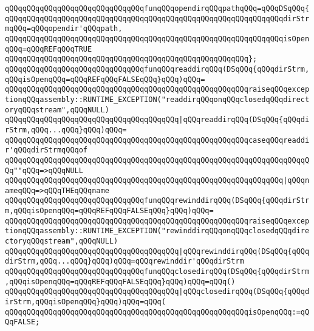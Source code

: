 \newline
\verb|qQQqqQQqqQQqqQQqqQQqqQQqqQQqqQQqfunqQQqopendirqQQqpathqQQq=qQQqDSqQQq{|\newline
\verb|qQQqqQQqqQQqqQQqqQQqqQQqqQQqqQQqqQQqqQQqqQQqqQQqqQQqqQQqqQQqqQQqdirStrmqQQq=qQQqopendir'qQQqpath,|\newline
\verb|qQQqqQQqqQQqqQQqqQQqqQQqqQQqqQQqqQQqqQQqqQQqqQQqqQQqqQQqqQQqqQQqisOpenqQQq=qQQqREFqQQqTRUE|\newline
\verb|qQQqqQQqqQQqqQQqqQQqqQQqqQQqqQQqqQQqqQQqqQQqqQQqqQQqqQQq};|\newline
\verb|qQQqqQQqqQQqqQQqqQQqqQQqqQQqqQQqfunqQQqreaddirqQQq(DSqQQq{qQQqdirStrm,qQQqisOpenqQQq=qQQqREFqQQqFALSEqQQq}qQQq)qQQq=|\newline
\verb|qQQqqQQqqQQqqQQqqQQqqQQqqQQqqQQqqQQqqQQqqQQqqQQqqQQqqQQqraiseqQQqexceptionqQQqassembly::RUNTIME_EXCEPTION("readdirqQQqonqQQqclosedqQQqdirectoryqQQqstream",qQQqNULL)|\newline
\verb|qQQqqQQqqQQqqQQqqQQqqQQqqQQqqQQqqQQqqQQq|\verb#|qQQqreaddirqQQq(DSqQQq{qQQqdirStrm,qQQq...qQQq}qQQq)qQQq=#\newline
\verb|qQQqqQQqqQQqqQQqqQQqqQQqqQQqqQQqqQQqqQQqqQQqqQQqqQQqqQQqcaseqQQqreaddir'qQQqdirStrmqQQqof|\newline
\verb|qQQqqQQqqQQqqQQqqQQqqQQqqQQqqQQqqQQqqQQqqQQqqQQqqQQqqQQqqQQqqQQqqQQqqQQq""qQQq=>qQQqNULL|\newline
\verb|qQQqqQQqqQQqqQQqqQQqqQQqqQQqqQQqqQQqqQQqqQQqqQQqqQQqqQQqqQQqqQQq|\verb#|qQQqnameqQQq=>qQQqTHEqQQqname#\newline
\verb|qQQqqQQqqQQqqQQqqQQqqQQqqQQqqQQqfunqQQqrewinddirqQQq(DSqQQq{qQQqdirStrm,qQQqisOpenqQQq=qQQqREFqQQqFALSEqQQq}qQQq)qQQq=|\newline
\verb|qQQqqQQqqQQqqQQqqQQqqQQqqQQqqQQqqQQqqQQqqQQqqQQqqQQqqQQqraiseqQQqexceptionqQQqassembly::RUNTIME_EXCEPTION("rewinddirqQQqonqQQqclosedqQQqdirectoryqQQqstream",qQQqNULL)|\newline
\verb|qQQqqQQqqQQqqQQqqQQqqQQqqQQqqQQqqQQqqQQq|\verb#|qQQqrewinddirqQQq(DSqQQq{qQQqdirStrm,qQQq...qQQq}qQQq)qQQq=qQQqrewinddir'qQQqdirStrm#\newline
\verb|qQQqqQQqqQQqqQQqqQQqqQQqqQQqqQQqfunqQQqclosedirqQQq(DSqQQq{qQQqdirStrm,qQQqisOpenqQQq=qQQqREFqQQqFALSEqQQq}qQQq)qQQq=qQQq()|\newline
\verb|qQQqqQQqqQQqqQQqqQQqqQQqqQQqqQQqqQQqqQQq|\verb#|qQQqclosedirqQQq(DSqQQq{qQQqdirStrm,qQQqisOpenqQQq}qQQq)qQQq=qQQq(#\newline
\verb|qQQqqQQqqQQqqQQqqQQqqQQqqQQqqQQqqQQqqQQqqQQqqQQqqQQqqQQqisOpenqQQq:=qQQqFALSE;|\newline
